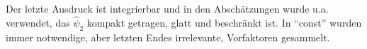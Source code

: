 
Der letzte Ausdruck ist integrierbar und in den Abschätzungen wurde u.a. verwendet, das $\hat\psi_2$ kompakt getragen, glatt und beschränkt ist. In "`const"' wurden immer notwendige, aber letzten Endes irrelevante, Vorfaktoren gesammelt.

